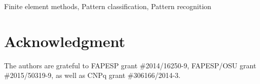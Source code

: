 \documentclass[journal]{IEEEtran}
\begin{document}
\begin{IEEEkeywords}
Finite element methods, Pattern classification, Pattern recognition
\end{IEEEkeywords}

\IEEEpeerreviewmaketitle







\section*{Acknowledgment}
The authors are grateful to FAPESP grant \#2014/16250-9, FAPESP/OSU grant \#2015/50319-9, as well as CNPq grant \#306166/2014-3.


\ifCLASSOPTIONcaptionsoff
  \newpage
\fi













\end{document}
